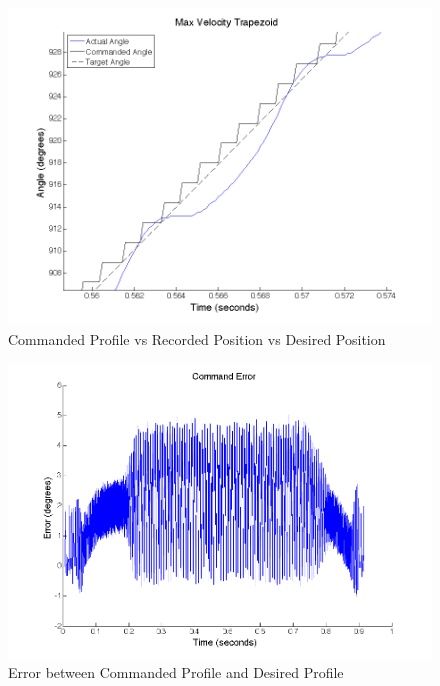 \documentclass{article}
\theoremstyle{plain}
\theoremstyle{definition}
\theoremstyle{remark}
\begin{document}
\begin{figure}[hbt]
\begin{center}
\includegraphics[width = 12cm]{4cProfileDetail1.png}
\caption{Commanded Profile vs Recorded Position vs Desired Position}
\label{Q4c_ProfileDetail}
\end{center}
\end{figure}

\begin{figure}[hbt]
\begin{center}
\includegraphics[width = 12cm]{4cCommandError.png}
\caption{Error between Commanded Profile and Desired Profile}
\label{Q4c_CE}
\end{center}
\end{figure}
\end{document}
